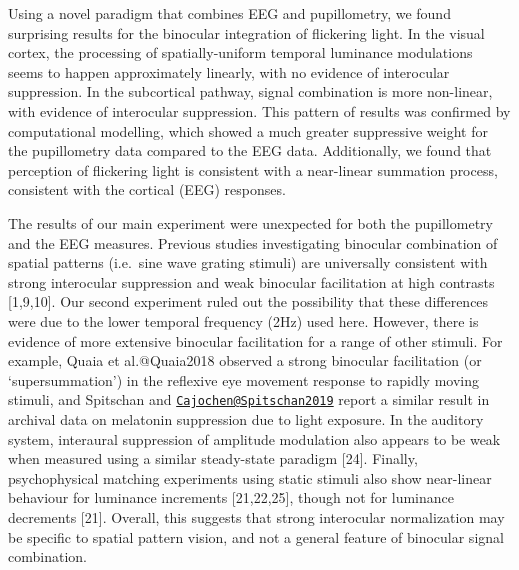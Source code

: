 \documentclass[
]{article}
\begin{document}
Using a novel paradigm that combines EEG and pupillometry, we found surprising results for the binocular integration of flickering light. In the visual cortex, the processing of spatially-uniform temporal luminance modulations seems to happen approximately linearly, with no evidence of interocular suppression. In the subcortical pathway, signal combination is more non-linear, with evidence of interocular suppression. This pattern of results was confirmed by computational modelling, which showed a much greater suppressive weight for the pupillometry data compared to the EEG data. Additionally, we found that perception of flickering light is consistent with a near-linear summation process, consistent with the cortical (EEG) responses.

The results of our main experiment were unexpected for both the pupillometry and the EEG measures. Previous studies investigating binocular combination of spatial patterns (i.e.~sine wave grating stimuli) are universally consistent with strong interocular suppression and weak binocular facilitation at high contrasts {[}1,9,10{]}. Our second experiment ruled out the possibility that these differences were due to the lower temporal frequency (2Hz) used here. However, there is evidence of more extensive binocular facilitation for a range of other stimuli. For example, Quaia et al.@Quaia2018 observed a strong binocular facilitation (or `supersummation') in the reflexive eye movement response to rapidly moving stimuli, and Spitschan and \href{mailto:Cajochen@Spitschan2019}{\nolinkurl{Cajochen@Spitschan2019}} report a similar result in archival data on melatonin suppression due to light exposure. In the auditory system, interaural suppression of amplitude modulation also appears to be weak when measured using a similar steady-state paradigm {[}24{]}. Finally, psychophysical matching experiments using static stimuli also show near-linear behaviour for luminance increments {[}21,22,25{]}, though not for luminance decrements {[}21{]}. Overall, this suggests that strong interocular normalization may be specific to spatial pattern vision, and not a general feature of binocular signal combination.
\end{document}
